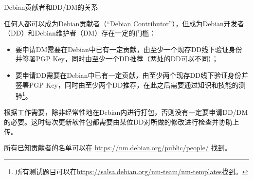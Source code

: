 \begin{frame}{Debian贡献者和DD/DM的关系}
	
    任何人都可以成为Debian贡献者（“Debian Contributor”），但成为Debian开发者（DD）和Debian维护者（DM）存在一定的门槛：
    \begin{itemize}
    	\item 要申请DM需要在Debian中已有一定贡献，由至少一个现存DD线下验证身份并签署PGP Key，同时由至少一个DD推荐（两处的DD可以不同）；
    	\item 要申请DD需要在Debian中已有一定贡献，由至少两个现存DD线下验证身份并签署PGP Key，同时由至少两个DD推荐，在此之后需要通过知识和技能的测验\footnote{所有测试题目可以在\url{https://salsa.debian.org/nm-team/nm-templates}找到。}。
    \end{itemize}

    \vfill
    
    根据工作需要，除非经常性地在Debian内进行打包，否则没有一定要申请DD/DM的必要。这时每次更新软件包都需要由某位DD对所做的修改进行检查并协助上传。
    
    所有已知贡献者的名单可以在 \url{https://nm.debian.org/public/people/} 找到。
\end{frame}